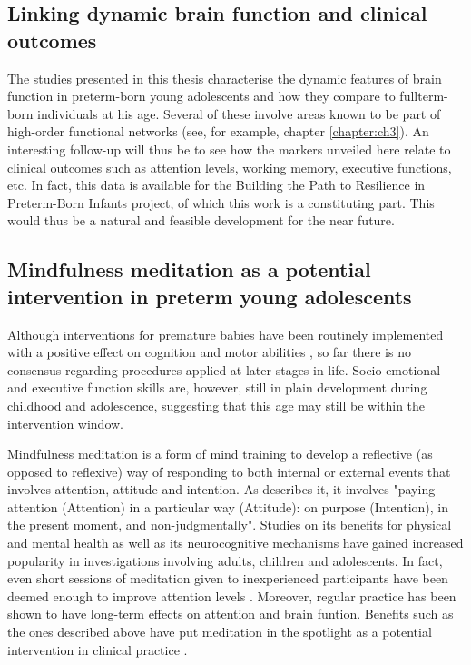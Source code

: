 \subsection*{Linking dynamic brain function and clinical outcomes}
The studies presented in this thesis characterise the dynamic features of brain function in preterm-born young adolescents and how they compare to fullterm-born individuals at his age. Several of these involve areas known to be part of high-order functional networks (see, for example, chapter \ref{chapter:ch3}). An interesting follow-up will thus be to see how the markers unveiled here relate to clinical outcomes such as attention levels, working memory, executive functions, etc. In fact, this data is available for the Building the Path to Resilience in Preterm-Born Infants project, of which this work is a constituting part. This would thus be a natural and feasible development for the near future.

\subsection*{Mindfulness meditation as a potential intervention in preterm young adolescents}

 Although interventions for premature babies have been routinely implemented with a positive effect on cognition and  motor abilities \citep{Ferreira2020}, so far there is no consensus regarding procedures applied at later stages in life. Socio-emotional and executive function skills are, however, still in plain development during childhood and adolescence, suggesting that this age may still be within the intervention window.


Mindfulness meditation is a form of mind training to develop a reflective (as opposed to reflexive) way of responding to both internal or external events \citep{Bishop2004} that involves attention, attitude and intention. As \citep{Kabat-Zinn1994} describes it, it involves "paying attention (Attention) in a particular way (Attitude): on purpose (Intention), in the present moment, and non-judgmentally". Studies on its benefits for physical and mental health as well as its neurocognitive mechanisms have gained increased popularity in investigations involving adults, children and adolescents. In fact, even short sessions of meditation given to inexperienced participants have been deemed enough to improve attention levels \citet{Norris2018, Jankowski2020}. Moreover, regular practice has been shown to have long-term effects on attention \citep{Zanesco2018} and brain funtion. Benefits such as the ones described above have put meditation in the spotlight as a potential intervention in clinical practice \citep{Simkin2014,Zhang2018}.

